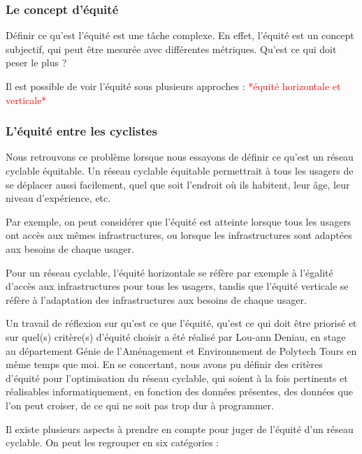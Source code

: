 \subsubsection{Le concept d'équité}

Définir ce qu'est l'équité est une tâche complexe. En effet, l'équité est un concept subjectif, qui peut être mesurée avec différentes métriques. Qu'est ce qui doit peser le plus ?

Il est possible de voir l'équité sous plusieurs approches : \textcolor{red}{*équité horizontale et verticale*}

\subsubsection{L'équité entre les cyclistes}

Nous retrouvons ce problème lorsque nous essayons de définir ce qu'est un réseau cyclable équitable. Un réseau cyclable équitable permettrait à tous les usagers de se déplacer aussi facilement, quel que soit l'endroit où ils habitent, leur âge, leur niveau d'expérience, etc. 

Par exemple, on peut considérer que l'équité est atteinte lorsque tous les usagers ont accès aux mêmes infrastructures, ou lorsque les infrastructures sont adaptées aux besoins de chaque usager.

Pour un réseau cyclable, l'équité horizontale se réfère par exemple à l'égalité d'accès aux infrastructures pour tous les usagers, tandis que l'équité verticale se réfère à l'adaptation des infrastructures aux besoins de chaque usager.

Un travail de réflexion sur qu'est ce que l'équité, qu'est ce qui doit être priorisé et sur quel(s) critère(s) d'équité choisir a été réalisé par Lou-ann Deniau, en stage au département Génie de l'Aménagement et Environnement de Polytech Tours en même temps que moi. En se concertant, nous avons pu définir des critères d'équité pour l'optimisation du réseau cyclable, qui soient à la fois pertinents et réalisables informatiquement, en fonction des données présentes, des données que l'on peut croiser, de ce qui ne soit pas trop dur à programmer.

Il existe plusieurs aspects à prendre en compte pour juger de l'équité d'un réseau cyclable. On peut les regrouper en six catégories : 


